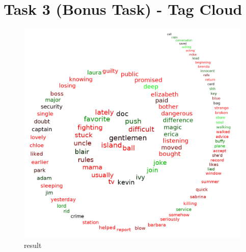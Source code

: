 \documentclass[a4paper]{article}
\begin{document}
	\section*{Task 3 (Bonus Task) - Tag Cloud}
	\begin{figure}[!ht]
		\centering
		\includegraphics[width=0.7\linewidth]{1_3}
		\caption{result}
	\end{figure}
	
\end{document}
